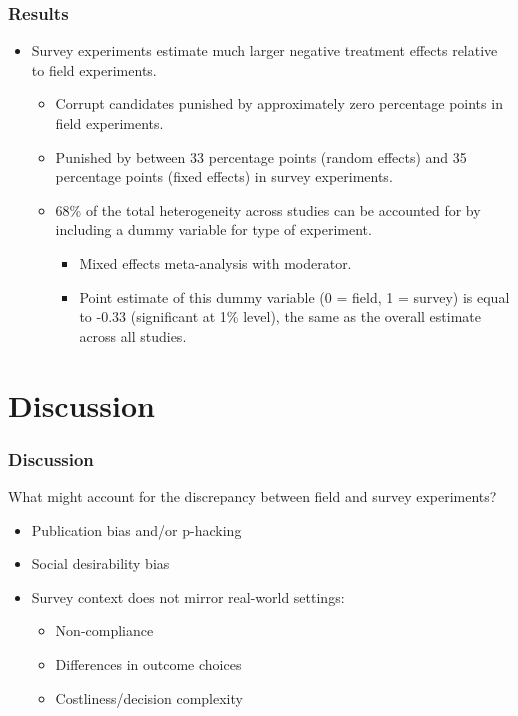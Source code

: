 \documentclass[usenames,dvipsnames]{beamer}
\begin{document}

\begin{frame}[label = results]
\frametitle{Results}
\begin{itemize}
\item Survey experiments estimate much larger negative treatment effects relative to field experiments. \hyperlink{lab}{}
\pause
\begin{itemize}
\item Corrupt candidates punished by approximately \textcolor{Cerulean}{zero percentage points} in field experiments.
\pause
\item Punished by between \textcolor{Cerulean}{33 percentage points} (random effects) and \textcolor{Cerulean}{35 percentage points} (fixed effects) in survey experiments.
\pause
\item 68\% of the total heterogeneity across studies can be accounted for by including a dummy variable for type of experiment.
\begin{itemize}
\item Mixed effects meta-analysis with moderator. 
\pause
\item Point estimate of this dummy variable (0 = field, 1 = survey) is equal to -0.33 (significant at 1\% level), the same as the overall estimate across all studies. 
\end{itemize}
\end{itemize}
\end{itemize}
\end{frame}

\section{Discussion}

\begin{frame}
\frametitle{Discussion}
What might account for the discrepancy between field and survey experiments?
\pause
\begin{itemize}
\item Publication bias and/or p-hacking
\pause
\item Social desirability bias
\pause
\item Survey context does not mirror real-world settings:
\begin{itemize}
\item Non-compliance
\item Differences in outcome choices
\item Costliness/decision complexity
\end{itemize}
\end{itemize}

\end{frame}
\end{document}
